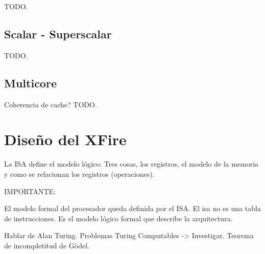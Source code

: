 TODO.

\subsection{Scalar - Superscalar}
\label{subsec:optimizations-scalar_superscalar}

TODO.

\subsection{Multicore}
\label{subsec:optimizations-multicore}

Coherencia de cache?
TODO.



\section{Diseño del XFire}

La ISA define el modelo lógico: Tres cosas, los registros, el modelo de la
memoria y como se relacionan los registros (operaciones).



IMPORTANTE:

El modelo formal del procesador queda definida por el ISA. El isa no es una tabla de instrucciones. Es el modelo lógico formal que describe la arquitectura.

Hablar de Alan Turing. Problemas Turing Computables -> Investigar. Teorema de incompletitud de Gödel.
